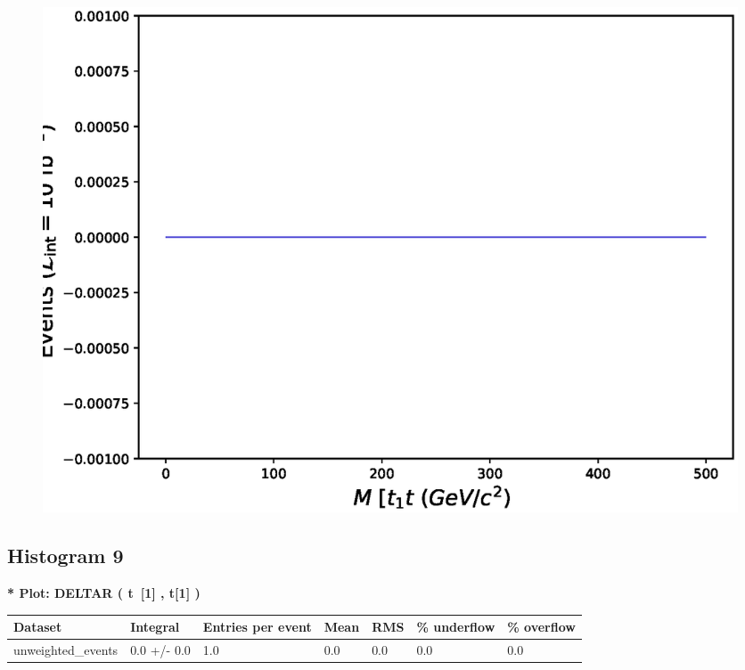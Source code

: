 \documentclass[a4paper, 10pt]{article}
\begin{document}
\begin{figure}[H]
  \begin{center}
    \includegraphics[scale=0.45]{selection_7.eps}\\
\caption{   }
  \end{center}
\end{figure}
      \newpage
\subsection{ Histogram 9}

\textbf{* Plot: DELTAR ( t~[1] , t[1] ) }\\
   \begin{table}[H]
  \begin{center}
    \begin{tabular}{|m{23.0mm}|m{23.0mm}|m{18.0mm}|m{19.0mm}|m{19.0mm}|m{19.0mm}|m{19.0mm}|}
      \hline
      {\cellcolor{yellow}         Dataset}& {\cellcolor{yellow}         Integral}& {\cellcolor{yellow}         Entries per event}& {\cellcolor{yellow}         Mean}& {\cellcolor{yellow}         RMS}& {\cellcolor{yellow}         \% underflow}& {\cellcolor{yellow}         \% overflow}\\
      \hline
      {\cellcolor{white}         unweighted\_events}& {\cellcolor{white}         0.0 +/\-- 0.0}& {\cellcolor{white}         1.0}& {\cellcolor{white}         0.0}& {\cellcolor{white}         0.0}& {\cellcolor{green}         0.0}& {\cellcolor{green}         0.0}\\
\hline
    \end{tabular}
  \end{center}
\end{table}
\end{document}
